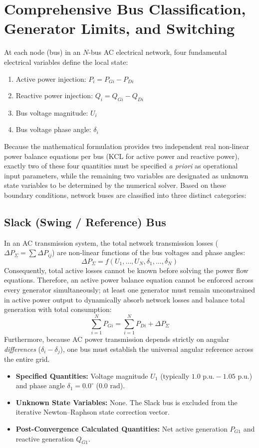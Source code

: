 \documentclass[12pt,a4paper,oneside]{report}
\begin{document}
\section{Comprehensive Bus Classification, Generator Limits, and Switching}
At each node (bus) in an $N$-bus AC electrical network, four fundamental electrical variables define the local state:
\begin{enumerate}
    \item Active power injection: $P_i = P_{Gi} - P_{Di}$
    \item Reactive power injection: $Q_i = Q_{Gi} - Q_{Di}$
    \item Bus voltage magnitude: $U_i$
    \item Bus voltage phase angle: $\delta_i$
\end{enumerate}

Because the mathematical formulation provides two independent real non-linear power balance equations per bus (KCL for active power and reactive power), exactly two of these four quantities must be specified \textit{a priori} as operational input parameters, while the remaining two variables are designated as unknown state variables to be determined by the numerical solver. Based on these boundary conditions, network buses are classified into three distinct categories:

\subsection{Slack (Swing / Reference) Bus}
In an AC transmission system, the total network transmission losses ($\Delta P_{\Sigma} = \sum \Delta P_{ij}$) are non-linear functions of the bus voltages and phase angles:
\begin{equation}
\Delta P_{\Sigma} = f(U_1, \dots, U_N, \delta_1, \dots, \delta_N)
\end{equation}
Consequently, total active losses cannot be known before solving the power flow equations. Therefore, an active power balance equation cannot be enforced across every generator simultaneously; at least one generator must remain unconstrained in active power output to dynamically absorb network losses and balance total generation with total consumption:
\begin{equation}
\sum_{i=1}^N P_{Gi} = \sum_{i=1}^N P_{Di} + \Delta P_{\Sigma}
\end{equation}
Furthermore, because AC power transmission depends strictly on angular \textit{differences} ($\delta_i - \delta_j$), one bus must establish the universal angular reference across the entire grid.
\begin{itemize}
    \item \textbf{Specified Quantities:} Voltage magnitude $U_1$ (typically $1.0\text{ p.u.} - 1.05\text{ p.u.}$) and phase angle $\delta_1 = 0.0^\circ$ ($0.0\text{ rad}$).
    \item \textbf{Unknown State Variables:} None. The Slack bus is excluded from the iterative Newton--Raphson state correction vector.
    \item \textbf{Post-Convergence Calculated Quantities:} Net active generation $P_{G1}$ and reactive generation $Q_{G1}$.
\end{itemize}
\end{document}
